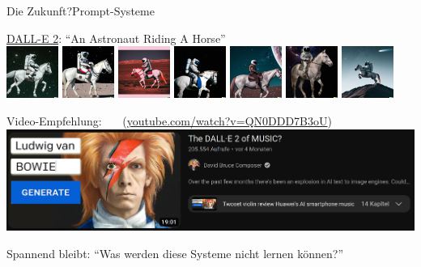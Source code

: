 \begin{frame}{Die Zukunft?}{Prompt-Systeme}
	
	\underline{DALL-E 2}: \enquote{An Astronaut Riding A Horse}\\
	\smallskip
	\includegraphics[width=1.7cm]{img/Dalle2-AstronautRidingHorse/0.jpg}
	\includegraphics[width=1.7cm]{img/Dalle2-AstronautRidingHorse/1.jpg}
	\includegraphics[width=1.7cm]{img/Dalle2-AstronautRidingHorse/2.jpg}
	\includegraphics[width=1.7cm]{img/Dalle2-AstronautRidingHorse/3.jpg}
	\includegraphics[width=1.7cm]{img/Dalle2-AstronautRidingHorse/5.jpg}
	\includegraphics[width=1.7cm]{img/Dalle2-AstronautRidingHorse/7.jpg}
	\includegraphics[width=1.7cm]{img/Dalle2-AstronautRidingHorse/9.jpg}
	
	\medskip
	Video-Empfehlung:~~~ {\tiny(\url{youtube.com/watch?v=QN0DDD7B3oU})}\\
	\smallskip
	\includegraphics[width=.8\textwidth]{img/DavidBruce_Dalle2OfMusic.png}
	
	
	\hfill Spannend bleibt: \enquote{Was werden diese Systeme nicht lernen können?}\hspace{-.5cm}
	
\end{frame}


